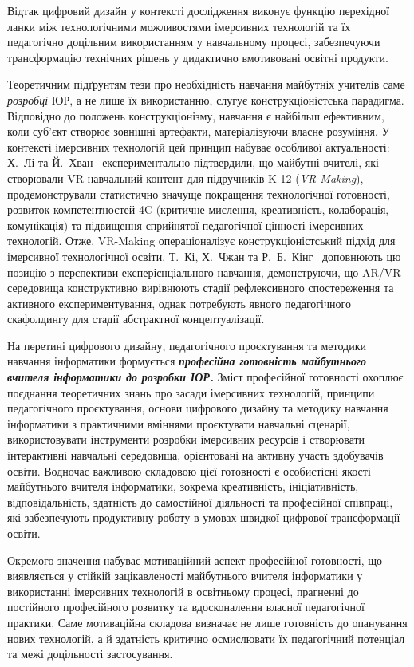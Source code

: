 Відтак цифровий дизайн у контексті дослідження виконує функцію перехідної ланки між технологічними можливостями імерсивних технологій та їх педагогічно доцільним використанням у навчальному процесі, забезпечуючи трансформацію технічних рішень у дидактично вмотивовані освітні продукти.

Теоретичним підґрунтям тези про необхідність навчання майбутніх учителів саме \emph{розробці} ІОР, а не лише їх використанню, слугує конструкціоністська парадигма. Відповідно до положень конструкціонізму, навчання є найбільш ефективним, коли суб'єкт створює зовнішні артефакти, матеріалізуючи власне розуміння. У контексті імерсивних технологій цей принцип набуває особливої актуальності: Х.~Лі та Й.~Хван~\cite{Lee2022VRMaking} експериментально підтвердили, що майбутні вчителі, які створювали VR-навчальний контент для підручників K-12 (\emph{VR-Making}), продемонстрували статистично значуще покращення технологічної готовності, розвиток компетентностей 4C (критичне мислення, креативність, колаборація, комунікація) та підвищення сприйнятої педагогічної цінності імерсивних технологій. Отже, VR-Making операціоналізує конструкціоністський підхід для імерсивної технологічної освіти. Т.~Кі, Х.~Чжан та Р.~Б.~Кінг~\cite{Kee2023Experiential} доповнюють цю позицію з перспективи експерієнціального навчання, демонструючи, що AR/VR-середовища конструктивно вирівнюють стадії рефлексивного спостереження та активного експериментування, однак потребують явного педагогічного скафолдингу для стадії абстрактної концептуалізації.

На перетині цифрового дизайну, педагогічного проєктування та методики навчання інформатики формується \emph{\textbf{професійна готовність майбутнього вчителя інформатики до розробки ІОР}}\emph{\textbf{.}} Зміст професійної готовності охоплює поєднання теоретичних знань про засади імерсивних технологій, принципи педагогічного проєктування, основи цифрового дизайну та методику навчання інформатики з практичними вміннями проєктувати навчальні сценарії, використовувати інструменти розробки імерсивних ресурсів і створювати інтерактивні навчальні середовища, орієнтовані на активну участь здобувачів освіти. Водночас важливою складовою цієї готовності є особистісні якості майбутнього вчителя інформатики, зокрема креативність, ініціативність, відповідальність, здатність до самостійної діяльності та професійної співпраці, які забезпечують продуктивну роботу в умовах швидкої цифрової трансформації освіти.

Окремого значення набуває мотиваційний аспект професійної готовності, що виявляється у стійкій зацікавленості майбутнього вчителя інформатики у використанні імерсивних технологій в освітньому процесі, прагненні до постійного професійного розвитку та вдосконалення власної педагогічної практики. Саме мотиваційна складова визначає не лише готовність до опанування нових технологій, а й здатність критично осмислювати їх педагогічний потенціал та межі доцільності застосування.

